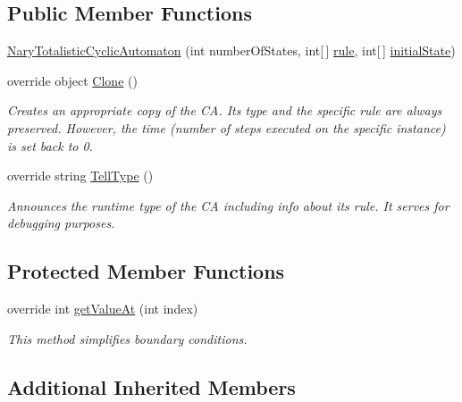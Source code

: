 \subsection*{Public Member Functions}
\begin{DoxyCompactItemize}
\item 
\hyperlink{class_cellular_1_1_nary_totalistic_cyclic_automaton_a4616b10ffadcaef7a2d21b47976844af}{Nary\+Totalistic\+Cyclic\+Automaton} (int number\+Of\+States, int\mbox{[}$\,$\mbox{]} \hyperlink{class_cellular_1_1_nary_totalistic_automaton_a878c767c6823bd8ed8dc0f7d2ccb1fd2}{rule}, int\mbox{[}$\,$\mbox{]} \hyperlink{all__1_8js_ae8b87ff4be2ae1dd5267342795263360}{initial\+State})
\item 
override object \hyperlink{class_cellular_1_1_nary_totalistic_cyclic_automaton_aa8d5a7d77a6dfc5f6e4fae6ba1c6cfd0}{Clone} ()
\begin{DoxyCompactList}\small\item\em Creates an appropriate copy of the C\+A. Its type and the specific rule are always preserved. However, the time (number of steps executed on the specific instance) is set back to 0. \end{DoxyCompactList}\item 
override string \hyperlink{class_cellular_1_1_nary_totalistic_cyclic_automaton_ac5c39cfb72386e3ab6132ab420091ae9}{Tell\+Type} ()
\begin{DoxyCompactList}\small\item\em Announces the runtime type of the C\+A including info about its rule. It serves for debugging purposes. \end{DoxyCompactList}\end{DoxyCompactItemize}
\subsection*{Protected Member Functions}
\begin{DoxyCompactItemize}
\item 
override int \hyperlink{class_cellular_1_1_nary_totalistic_cyclic_automaton_a422dbcbd3e3cd3efdccc21724e7c6b01}{get\+Value\+At} (int index)
\begin{DoxyCompactList}\small\item\em This method simplifies boundary conditions. \end{DoxyCompactList}\end{DoxyCompactItemize}
\subsection*{Additional Inherited Members}


